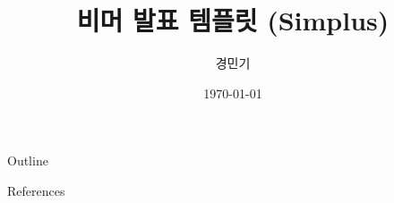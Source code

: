 \documentclass{beamer}
\title[Sample]{비머 발표 템플릿 (Simplus)}
\author[Kyung]{경민기}
\institute{}
\date{\today}
\begin{document}
\begin{frame}[plain]
  \titlepage
\end{frame}

\begin{frame}[plain]{Outline}
  \tableofcontents
\end{frame}





\begin{frame}[allowframebreaks]{References}
  \nocite{*}
  
  
\end{frame}
\end{document}

